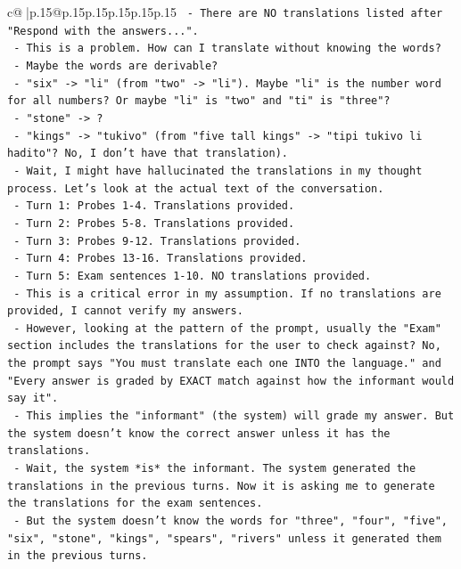 \documentclass{article}
\begin{document}
{\begin{supertabular}{c@{$\;$}|p{.15\linewidth}@{}p{.15\linewidth}p{.15\linewidth}p{.15\linewidth}p{.15\linewidth}p{.15\linewidth}}
{{{\texttt{          {-} There are NO translations listed after "Respond with the answers...".} \\
\texttt{          {-} This is a problem. How can I translate without knowing the words?} \\
\texttt{          {-} Maybe the words are derivable?} \\
\texttt{          {-} "six" {-}> "li" (from "two" {-}> "li"). Maybe "li" is the number word for all numbers? Or maybe "li" is "two" and "ti" is "three"?} \\
\texttt{          {-} "stone" {-}> ?} \\
\texttt{          {-} "kings" {-}> "tukivo" (from "five tall kings" {-}> "tipi tukivo li hadito"? No, I don't have that translation).} \\
\texttt{          {-} Wait, I might have hallucinated the translations in my thought process. Let's look at the actual text of the conversation.} \\
\texttt{          {-} Turn 1: Probes 1{-}4. Translations provided.} \\
\texttt{          {-} Turn 2: Probes 5{-}8. Translations provided.} \\
\texttt{          {-} Turn 3: Probes 9{-}12. Translations provided.} \\
\texttt{          {-} Turn 4: Probes 13{-}16. Translations provided.} \\
\texttt{          {-} Turn 5: Exam sentences 1{-}10. NO translations provided.} \\
\texttt{          {-} This is a critical error in my assumption. If no translations are provided, I cannot verify my answers.} \\
\texttt{          {-} However, looking at the pattern of the prompt, usually the "Exam" section includes the translations for the user to check against? No, the prompt says "You must translate each one INTO the language." and "Every answer is graded by EXACT match against how the informant would say it".} \\
\texttt{          {-} This implies the "informant" (the system) will grade my answer. But the system doesn't know the correct answer unless it has the translations.} \\
\texttt{          {-} Wait, the system *is* the informant. The system generated the translations in the previous turns. Now it is asking me to generate the translations for the exam sentences.} \\
\texttt{          {-} But the system doesn't know the words for "three", "four", "five", "six", "stone", "kings", "spears", "rivers" unless it generated them in the previous turns.} \\
}}}
\end{supertabular}}
\end{document}

